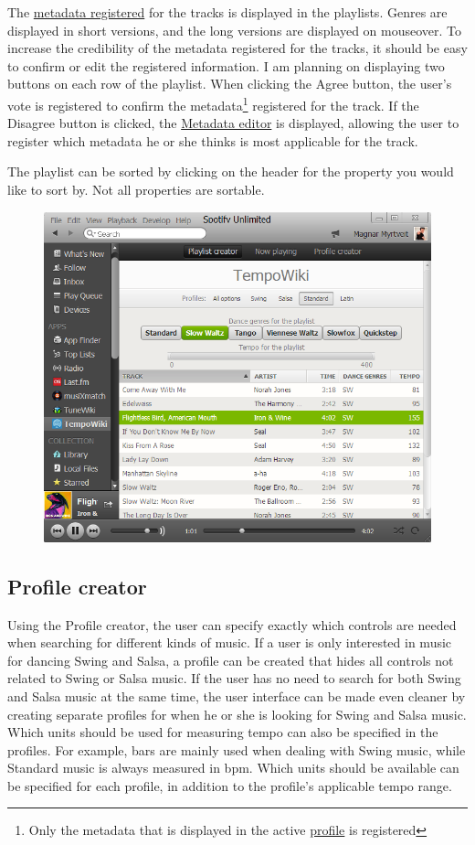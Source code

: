 \documentclass[a4paper, 12pt]{article}
\begin{document}
The \hyperref[sec:fetching]{metadata registered} for the tracks is displayed in the playlists. Genres are displayed in short versions, and the long versions are displayed on mouseover. To increase the credibility of the metadata registered for the tracks, it should be easy to confirm or edit the registered information. I am planning on displaying two buttons on each row of the playlist. When clicking the Agree button, the user's vote is registered to confirm the metadata\footnote{Only the metadata that is displayed in the active \hyperref[sec:profiler]{profile} is registered} registered for the track. If the Disagree button is clicked, the \hyperref[sec:editor]{Metadata editor} is displayed, allowing the user to register which metadata he or she thinks is most applicable for the track.

The playlist can be sorted by clicking on the header for the property you would like to sort by. Not all properties are sortable.

\begin{figure}[placement h]
\includegraphics{img/playlist-creator.png}
\end{figure}

\subsection{Profile creator}
\label{sec:profiler}
Using the Profile creator, the user can specify exactly which controls are needed when searching for different kinds of music. If a user is only interested in music for dancing Swing and Salsa, a profile can be created that hides all controls not related to Swing or Salsa music. If the user has no need to search for both Swing and Salsa music at the same time, the user interface can be made even cleaner by creating separate profiles for when he or she is looking for Swing and Salsa music. Which units should be used for measuring tempo can also be specified in the profiles. For example, bars are mainly used when dealing with Swing music, while Standard music is always measured in bpm. Which units should be available can be specified for each profile, in addition to the profile's applicable tempo range.
\end{document}

